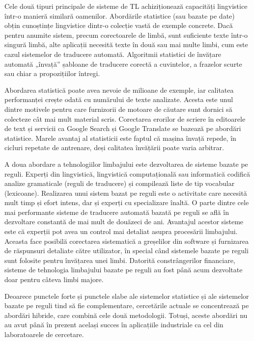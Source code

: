 \begin{multicols}{2}
Cele două tipuri principale de sisteme de TL achiziționează capacități lingvistice \mbox{într-o} manieră similară oamenilor. Abordările statistice (sau bazate pe date) obțin cunoștințe lingvistice \mbox{dintr-o} colecție vastă de exemple concrete. Dacă pentru anumite sistem, precum corectoarele de limbă, sunt suficiente texte \mbox{într-o} singură limbă, alte aplicații necesită texte în două sau mai multe limbi, cum este cazul sistemelor de traducere automată. Algoritmii statistici de învățare automată „învață” șabloane de traducere corectă a cuvintelor, a frazelor scurte sau chiar a propozițiilor întregi.

Abordarea statistică poate avea nevoie de milioane de exemple, iar calitatea performanței crește odată cu numărului de texte analizate. Acesta este unul dintre motivele pentru care furnizorii de motoare de căutare sunt dornici să colecteze cât mai mult material scris. Corectarea erorilor de scriere în editoarele de text și servicii ca Google Search și Google Translate se bazează pe abordări statistice. Marele avantaj al statisticii este faptul că mașina învață repede, în cicluri repetate de antrenare, deși calitatea învățării poate varia arbitrar.

A doua abordare a tehnologiilor limbajului este dezvoltarea de sisteme bazate pe reguli. Experți din lingvistică, lingvistică computațională sau informatică codifică analize gramaticale (reguli de traducere) și compilează liste de tip vocabular (lexicoane). Realizarea unui sistem bazat pe reguli este o activitate care necesită mult timp și efort intens, dar și experți cu specializare înaltă. O parte dintre cele mai performante sisteme de traducere automată bazată pe reguli se află în dezvoltare constantă de mai mult de douăzeci de ani. Avantajul acestor sisteme este că experții pot avea un control mai detaliat asupra procesării limbajului. Aceasta face posibilă corectarea sistematică a greșelilor din software și furnizarea de răspunsuri detaliate către utilizator, în special când sistemele bazate pe reguli sunt folosite pentru învățarea unei limbi. Datorită constrângerilor financiare, sisteme de tehnologia limbajului bazate pe reguli au fost până acum dezvoltate doar pentru câteva limbi majore.

Deoarece punctele forte și punctele slabe ale sistemelor statistice și ale sistemelor bazate pe reguli tind să fie complementare, cercetările actuale se concentrează pe abordări hibride, care combină cele două metodologii. Totuși, aceste abordări nu au avut până în prezent același succes în aplicațiile industriale ca cel din laboratoarele de cercetare.


\end{multicols}
